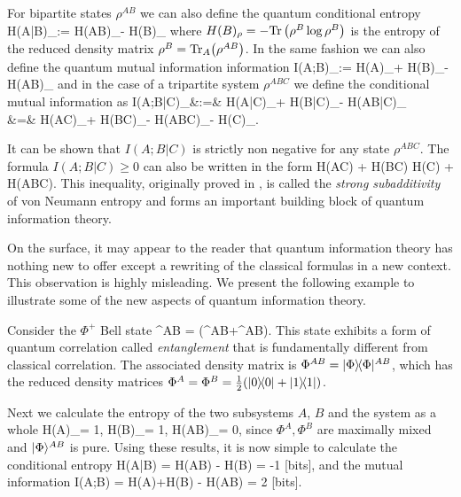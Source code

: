 \documentclass[aps,11pt,twoside,letterpaper]{article}
\def \Tr{\textup{Tr}}
\theoremstyle{plain}
\theoremstyle{definition}
\begin{document}
			For bipartite states $\rho^{AB}$ we can also define the quantum conditional entropy
			\be
				H(A|B)_\rho 	:= 		H(AB)_\rho - H(B)_\rho					\label{cond-entrpy} 
			\ee
			where $H(B)_\rho = -\Tr\left(\rho^B\log\rho^B\right)$ is the entropy of the reduced density matrix
			$\rho^B = \Tr_A\!\left( \rho^{AB}\right)$. In the same fashion we can also define the 
			quantum mutual information information
			\be
				I(A;B)_\rho 	:=		H(A)_\rho + H(B)_\rho - H(AB)_\rho 
			\ee
			and in the case of a tripartite system $\rho^{ABC}$ we define the conditional mutual information 
			as 
			\bea
				I(A;B|C)_\rho 	&:=&	H(A|C)_\rho + H(B|C)_\rho - H(AB|C)_\rho \label{cond-mut-info} \\
								&=&		H(AC)_\rho + H(BC)_\rho - H(ABC)_\rho - H(C)_\rho.
			\eea
			
			\noindent It can be shown that $I(A;B|C)$ is strictly non negative for any state $\rho^{ABC}$.
			The formula $I(A;B|C)\geq 0$ can also be written in the form
			\be	\label{strong-subadditivity}
				H(AC) + H(BC) 	\geq	H(C) + H(ABC).
			\ee
			This inequality, originally proved in \cite{LR73}, is called the \emph{strong subadditivity} of von Neumann 
			entropy and forms an important building block of quantum information theory.
			\index{strong subadditivity}
			
			
			
			
			On the surface, it may appear to the reader that quantum information theory has nothing new to offer except 
			a rewriting of the classical formulas in a new context.
			This observation is highly misleading.
			We present the following example to illustrate some of the new aspects of quantum information theory.
			
			\begin{example}	\label{example:EPR-pair}
				Consider the $\Phi^{+}$\! Bell state 
				\be
					\ket{\Phi}^{AB} = (^{AB}+\ket{11}^{AB}).
				\ee
				This state exhibits a form of quantum correlation called \emph{entanglement} that is fundamentally
				different from classical correlation.
				The associated density matrix is $\Phi^{AB} = | \Phi \rangle\!\langle \Phi |^{AB}$, which has
				the reduced density matrices $\Phi^A = \Phi^B = \tfrac{1}{2}(| 0 \rangle\!\langle 0 | + | 1 \rangle\!\langle 1 |)$.
				
				Next we calculate the entropy of the two subsystems $A$, $B$ and the system as a whole 
				\be
					H(A)_\Phi = 1, 	\qquad
					H(B)_\Phi = 1, 	\qquad
					H(AB)_\Phi = 0,
				\ee
				since $\Phi^A,\Phi^B$ are maximally mixed and $| \Phi \rangle^{AB}$ is pure.
				Using these results, it is now simple to calculate the conditional entropy
				\be	\label{cond-ent-can-be-neg}
					H(A|B)	=	H(AB) - H(B)	= -1 \textup{ [bits]},
				nd the mutual information
				\be	\label{mutual-inf-can-be-2}
					I(A;B)	=	H(A)+H(B) - H(AB)	= 2 \textup{ [bits]}.
				\ee
			\end{example}
			
\end{document}
